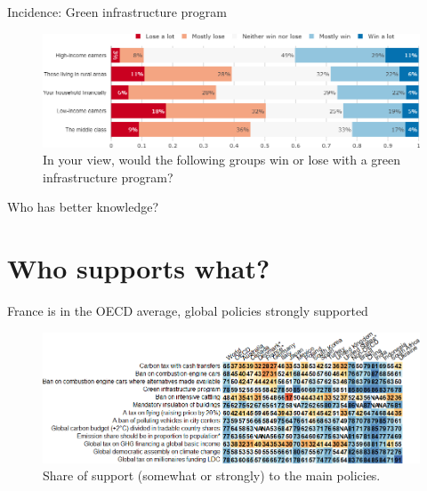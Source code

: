 \begin{framefont}{\small}
\begin{frame}{Incidence: Green infrastructure program}%
	\begin{figure}[h!]
	\centering
	\caption{In your view, would the following groups win or lose with a green infrastructure program?}
	\includegraphics[width=.87\paperwidth]{../figures/FR/investments_win_lose_FR.png}
	\end{figure}
\end{frame}
	

\begin{frame}{Who has better knowledge?}
\end{frame}

\section{Who supports what?}%

\begin{frame}{France is in the OECD average, global policies strongly supported}
	\begin{figure}[h!]
		\centering		
		\caption{Share of support (somewhat or strongly) to the main policies.}
		\includegraphics[width=\paperwidth]{../figures/country_comparison/main_policies_positive_countries.png}
		\end{figure}
\end{frame}



\end{framefont}
